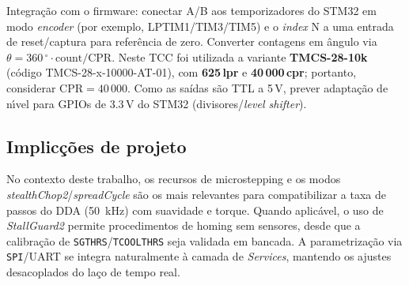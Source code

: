 Integra\c{c}\~ao com o firmware: conectar A/B aos temporizadores do STM32 em modo
\emph{encoder} (por exemplo, LPTIM1/TIM3/TIM5) e o \emph{index} N a uma entrada
de reset/captura para refer\^encia de zero. Converter contagens em \^angulo via
\(\theta = 360\,^{\circ} \cdot \text{count}/\text{CPR}\). Neste TCC foi utilizada a
variante \textbf{TMCS-28-10k} (c\'odigo TMCS-28-x-10000-AT-01), com
\textbf{625\,lpr} e \textbf{40\,000\,cpr}; portanto, considerar \(\text{CPR}=40\,000\).
Como as sa\'idas s\~ao TTL a 5\,V, prever adapta\c{c}\~ao
de n\'{\i}vel para GPIOs de 3.3\,V do STM32 (divisores/\emph{level shifter}).

\subsection{Implic\c{c}\~oes de projeto}

No contexto deste trabalho, os recursos de microstepping e os modos
\textit{stealthChop2}/\textit{spreadCycle} s\~ao os mais relevantes para
compatibilizar a taxa de passos do DDA (\SI{50}{\kilo\hertz}) com suavidade e
torque. Quando aplic\'avel, o uso de \textit{StallGuard2} permite
procedimentos de homing sem sensores, desde que a calibra\c{c}\~ao de
\texttt{SGTHRS}/\texttt{TCOOLTHRS} seja validada em bancada. A parametriza\c{c}\~ao
via \texttt{SPI}/UART se integra naturalmente \`a camada de \emph{Services},
mantendo os ajustes desacoplados do la\c{c}o de tempo real.
